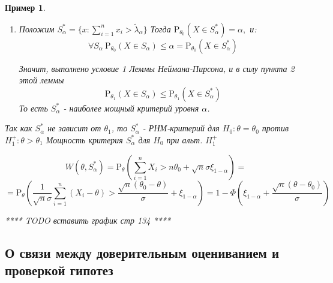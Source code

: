 \documentclass[12pt]{article}
\newtheorem*{example}{Пример}
\theoremstyle{basic_theorem}
\theoremstyle{name_theorem}
\def\P{ \mathrm{P} }
\begin{document}
\begin{example}
\begin{enumerate}
        \item Положим \(S^*_{\alpha} = \{x: \sum_{i=1}^n x_i > \widetilde{\lambda}_\alpha\}\)
            Тогда \(\P_{\theta_0}(X\in S_\alpha^*)=\alpha,\) и:
            \[\forall S_\alpha\ \P_{\theta_0}(X\in S_\alpha)\leq\alpha = \P_{\theta_0}(X\in S_\alpha^*)\]

            Значит, выполнено условие 1 Леммы Неймана-Пирсона, и в силу
            пункта 2 этой леммы
            \[\P_{\theta_1}(X\in S_\alpha) \leq \P_{\theta_1}(X\in S_\alpha^*)\]
            То есть \(S_\alpha^*\) - наиболее мощный критерий уровня \(\alpha\).
        \end{enumerate}
        Так как \(S^*_{\alpha}\) не зависит от \(\theta_1\),
        то \(S^*_{\alpha}\) - РНМ-критерий для \(H_0: \theta = \theta_0\)
        против \(H^+_1 : \theta > \theta_1\)
        Мощность критерия \(S^*_{\alpha}\) для \(H_0\) при альт. \(H^+_1\)

        \[W(\theta, S^*_{\alpha}) = \P_\theta\left(\sum_{i=1}^nX_i > n\theta_0 + \sqrt{n}\sigma\xi_{1-\alpha}\right) = \]
        \[ = \P_\theta\left(\frac{1}{\sqrt{n}\sigma} \sum_{i=1}^n(X_i - \theta) > \frac{\sqrt{n}(\theta_0 - \theta)}{\sigma} + \xi_{1-\alpha}\right) =
        1 - \Phi\left(\xi_{1-\alpha} + \frac{\sqrt{n}(\theta - \theta_0)}{\sigma}\right)\]

        **** TODO вставить график стр 134 ****

\end{example}

\subsection*{О связи между доверительным оцениванием и проверкой гипотез}
\end{document}
